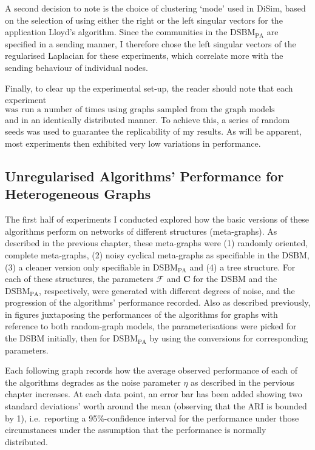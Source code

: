 A second decision to note is the choice of clustering `mode' used in DiSim, based on the selection 
of using either the right or the left singular vectors for the application Lloyd's algorithm. 
Since the communities in the $\mathrm{DSBM}_\mathrm{PA}$ are specified in a sending manner, I 
therefore chose the left singular vectors of the regularised Laplacian for these experiments, 
which correlate more with the sending behaviour of individual nodes.

Finally, to clear up the experimental set-up, the reader should note that each experiment 
$\text{was run a number of times using graphs sampled from the graph models independently}$ and in an
identically 
distributed manner. To achieve this, a series of random seeds was used to guarantee the 
replicability of my results. As will be apparent, most experiments then exhibited very low 
variations in performance.

\subsection{Unregularised Algorithms' Performance for Heterogeneous Graphs}

The first half of experiments I conducted explored how the basic versions of these algorithms 
perform on networks of different structures (meta-graphs). As described in the previous chapter, 
these meta-graphs were (1) randomly oriented, complete meta-graphs, (2) noisy cyclical meta-graphs 
as specifiable in the DSBM, (3) a cleaner version only specifiable in $\mathrm{DSBM}_\mathrm{PA}$ 
and (4) a tree structure. For each of these structures, the parameters $\mathcal F$ and $\mathbf C$
 for the DSBM and the $\mathrm{DSBM}_\mathrm{PA}$, respectively, were generated with different 
degrees of noise, and the progression of the algorithms' performance recorded. Also as described 
previously, in figures juxtaposing the performances of the algorithms for graphs with reference to 
both random-graph models, the parameterisations were picked for the DSBM initially, then for 
$\mathrm{DSBM}_\mathrm{PA}$ by using the conversions for corresponding parameters.

Each following graph records how the average observed performance of each of the algorithms 
degrades as the noise parameter $\eta$ as described in the pervious chapter increases. At each 
data point, an error bar has been added showing two standard deviations' worth around the mean 
(observing that the ARI is bounded by 1), i.e.\ reporting a 95\%-confidence interval for the 
performance under those circumstances under the assumption that the performance is normally 
distributed.

